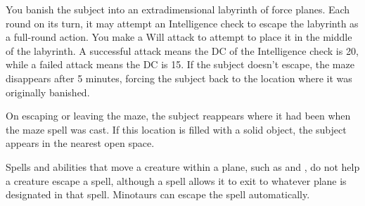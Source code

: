 \spellrng{\rngclose}
\begin{spelleffect}
  You banish the subject into an extradimensional labyrinth of force planes. Each round on its turn, it may attempt an Intelligence check to escape the labyrinth as a full-round action. You make a Will attack to attempt to place it in the middle of the labyrinth. A successful attack means the DC of the Intelligence check is 20, while a failed attack means the DC is 15. If the subject doesn't escape, the maze disappears after 5 minutes, forcing the subject back to the location where it was originally banished.
  \par On escaping or leaving the maze, the subject reappears where it had been when the maze spell was cast. If this location is filled with a solid object, the subject appears in the nearest open space.
\end{spelleffect}
\begin{spellnotes}
  Spells and abilities that move a creature within a plane, such as  and , do not help a creature escape a  spell, although a  spell allows it to exit to whatever plane is designated in that spell. Minotaurs can escape the spell automatically.
\end{spellnotes}

